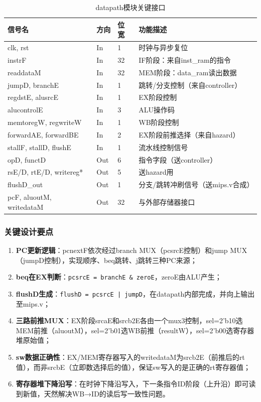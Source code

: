 \begin{table}[htp]
\caption{datapath模块关键接口}\label{tab:dp}
\centering
\begin{tabular}{|l|l|l|p{5.5cm}|}
\hline
\textbf{信号名} & \textbf{方向} & \textbf{位宽} & \textbf{功能描述} \\ \hline\hline
clk, rst            & In  & 1  & 时钟与异步复位 \\ \hline
instrF              & In  & 32 & IF阶段：来自inst\_ram的指令 \\ \hline
readdataM           & In  & 32 & MEM阶段：data\_ram读出数据 \\ \hline
jumpD, branchE      & In  & 1  & 跳转/分支控制（来自controller） \\ \hline
regdstE, alusrcE    & In  & 1  & EX阶段控制 \\ \hline
alucontrolE         & In  & 3  & ALU操作码 \\ \hline
memtoregW, regwriteW & In & 1  & WB阶段控制 \\ \hline
forwardAE, forwardBE & In & 2  & EX阶段前推选择（来自hazard）\\ \hline
stallF, stallD, flushE & In & 1 & 流水线控制信号 \\ \hline
opD, functD         & Out & 6  & 指令字段（送controller） \\ \hline
rsE/D, rtE/D, writereg* & Out & 5 & 送hazard用 \\ \hline
flushD\_out         & Out & 1  & 分支/跳转冲刷信号（送mips.v合成）\\ \hline
pcF, aluoutM, writedataM & Out & 32 & 与外部存储器接口 \\ \hline
\end{tabular}
\end{table}

\subsubsection{关键设计要点}

\begin{enumerate}[(1)]
    \item \textbf{PC更新逻辑}：pcnextF依次经过branch MUX（pcsrcE控制）和jump MUX（jumpD控制），实现顺序、beq跳转、j跳转三种PC来源；
    \item \textbf{beq在EX判断}：\texttt{pcsrcE = branchE \& zeroE}，zeroE由ALU产生；
    \item \textbf{flushD生成}：\texttt{flushD = pcsrcE | jumpD}，在datapath内部完成，并向上输出至mips.v；
    \item \textbf{三路前推MUX}：EX阶段srcaE和srcb2E各由一个mux3控制，sel=2'b10选MEM前推（aluoutM），sel=2'b01选WB前推（resultW），sel=2'b00选寄存器堆原始值；
    \item \textbf{sw数据正确性}：EX/MEM寄存器写入的writedataM为srcb2E（前推后的rt值），而非srcbE（立即数选择后的值），保证sw写入的是正确的rt寄存器值；
    \item \textbf{寄存器堆下降沿写}：在时钟下降沿写入，下一条指令ID阶段（上升沿）即可读到新值，天然解决WB→ID的读后写一致性问题。
\end{enumerate}

